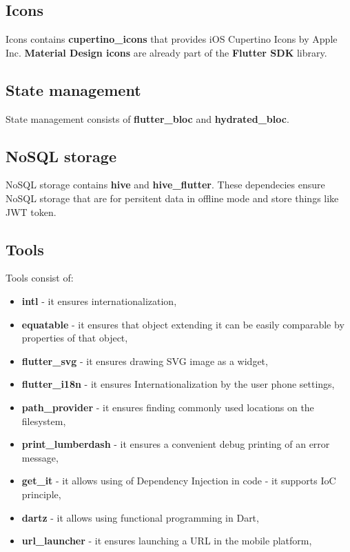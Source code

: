 \subsection{Icons}\label{subsec:icons}
Icons contains \textbf{cupertino\_icons} that provides iOS Cupertino Icons by Apple Inc.
\textbf{Material Design icons} are already part of the \textbf{Flutter SDK} library.

\subsection{State management}\label{subsec:state-management}
State management consists of \textbf{flutter\_bloc} and \textbf{hydrated\_bloc}.

\subsection{NoSQL storage}\label{subsec:nosql-storage}
NoSQL storage contains \textbf{hive} and \textbf{hive\_flutter}.
These dependecies ensure NoSQL storage that are for persitent data in offline mode and store things like JWT token.\cite{jwtToken} %

\subsection{Tools}\label{subsec:tools}
Tools consist of:
\begin{itemize}
    \item \textbf{intl} - it ensures internationalization,
    \item \textbf{equatable} - it ensures that object extending it can be easily comparable by properties of that object,
    \item \textbf{flutter\_svg} - it ensures drawing SVG image as a widget,
    \item \textbf{flutter\_i18n} - it ensures Internationalization by the user phone settings,
    \item \textbf{path\_provider} - it ensures finding commonly used locations on the filesystem,
    \item \textbf{print\_lumberdash} - it ensures a convenient debug printing of an error message,
    \item \textbf{get\_it} - it allows using of Dependency Injection in code - it supports IoC principle,\cite{iocPrinciple}
    \item \textbf{dartz} - it allows using functional programming in Dart,
    \item \textbf{url\_launcher} - it ensures launching a URL in the mobile platform,
\end{itemize}

